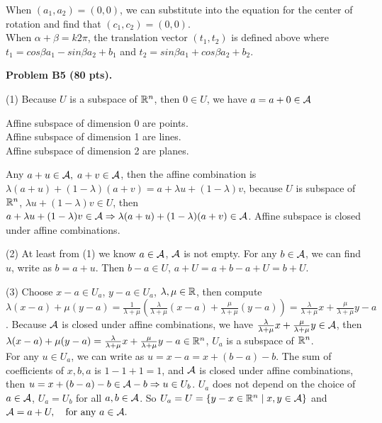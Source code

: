 \documentclass[12pt]{article}
\begin{document}
When $(a_1,a_2)=(0,0)$, we can substitute into the equation for the center of rotation and find that $(c_1,c_2)= (0,0)$.\\

When $\alpha + \beta = k2\pi$, the translation vector $(t_1,t_2)$ is defined above where $t_1= cos\beta a_1 - sin\beta a_2 + b_1$ and $t_2 = sin\beta a_1 + cos\beta a_2 + b_2$.

\vspace {0.5cm}\noindent
{\bf Problem B5 (80 pts).}

\medskip
(1)
Because $U$ is a subspace of $\mathbb{R}^n$, then $0 \in U$, we have $a = 
a + 0 \in {\cal A}$
\begin{center}
Affine subspace of dimension 0 are points. \\
Affine subspace of dimension 1 are lines. \\
Affine subspace of dimension 2 are planes. \\
\end{center}
Any $a + u \in {\cal A}, \; a + v \in {\cal A}$, then the affine combination is $\lambda (a + u) + (1 - \lambda) (a + v) = a + \lambda u + (1 - \lambda) v$, because $U$ is subspace of $\mathbb{R}^n$, $\lambda u + (1 - \lambda) v \in U$, then $a + \lambda u + (1 - \lambda) v \in {\cal A} \Rightarrow \lambda (a + u) + (1 - \lambda) (a + v) \in {\cal A}$. Affine subspace is closed under affine combinations.

\medskip
(2) At least from (1) we know $a \in {\cal A}$, ${\cal A}$ is not empty.
For any $b \in {\cal A}$, we can find $u$, write as $b = a + u$. Then   $b - a \in U$, $a + U = a + b - a + U = b + U$.

\medskip
(3)
Choose $x - a \in U_a$, $y - a \in U_a$, $\lambda, \mu \in \mathbb{R}$, then compute $\lambda (x - a) + \mu (y - a) = \frac{1}{\lambda + \mu}(\frac{\lambda}{\lambda + \mu}(x - a) + \frac{\mu}{\lambda + \mu}(y - a)) = \frac{\lambda}{\lambda + \mu} x + \frac{\mu}{\lambda + \mu} y - a$. Because ${\cal A}$ is closed under affine combinations, we have $\frac{\lambda}{\lambda + \mu} x + \frac{\mu}{\lambda + \mu} y \in {\cal A}$, then $\lambda (x - a) + \mu (y - a) = \frac{\lambda}{\lambda + \mu} x + \frac{\mu}{\lambda + \mu} y - a \in \mathbb{R}^n$, $U_a$ is a subspace of $\mathbb{R}^n$.\\
For any $u \in U_a$, we can write as $u = x - a = x + (b - a) - b$. The sum of coefficients of $x, b, a$ is $1 -1 + 1 = 1$, and ${\cal A}$ is closed under affine combinations, then $u = x + (b -a)-b \in {\cal A} - b \Rightarrow u \in U_b$. $U_a$ does not depend on the choice of $a \in {\cal A}$, $U_a = U_b$ for all $a, b\in {\cal A}$.
So $U_a = U = \{y - x \in \mathbb{R}^n \mid x, y \in {\cal A}\}$ and
$
{\cal A} = a + U, \quad\hbox{for any $a\in {\cal A}$}.
$
\end{document}
